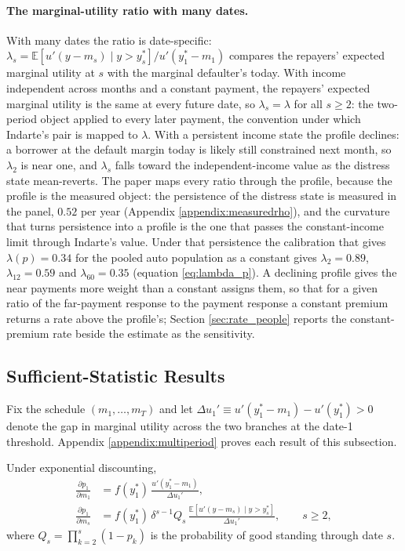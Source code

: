\paragraph{The marginal-utility ratio with many dates.} With many dates the ratio is date-specific: $\lambda_s = \mathbb{E}[u'(y - m_s) \mid y > y_s^*]/u'(y_1^* - m_1)$ compares the repayers' expected marginal utility at $s$ with the marginal defaulter's today. With income independent across months and a constant payment, the repayers' expected marginal utility is the same at every future date, so $\lambda_s = \lambda$ for all $s \ge 2$: the two-period object applied to every later payment, the convention under which Indarte's pair is mapped to $\lambda$. With a persistent income state the profile declines: a borrower at the default margin today is likely still constrained next month, so $\lambda_2$ is near one, and $\lambda_s$ falls toward the independent-income value as the distress state mean-reverts. The paper maps every ratio through the profile, because the profile is the measured object: the persistence of the distress state is measured in the panel, $0.52$ per year (Appendix \ref{appendix:measuredrho}), and the curvature that turns persistence into a profile is the one that passes the constant-income limit through Indarte's value. Under that persistence the calibration that gives $\lambda(p) = 0.34$ for the pooled auto population as a constant gives $\lambda_2 = 0.89$, $\lambda_{12} = 0.59$ and $\lambda_{60} = 0.35$ (equation \eqref{eq:lambda_p}). A declining profile gives the near payments more weight than a constant assigns them, so that for a given ratio of the far-payment response to the payment response a constant premium returns a rate above the profile's; Section \ref{sec:rate_people} reports the constant-premium rate beside the estimate as the sensitivity.

\subsection{Sufficient-Statistic Results}\label{sec:results}

Fix the schedule $(m_1,\dots,m_T)$ and let $\Delta u_1' \equiv u'(y_1^* - m_1) - u'(y_1^*) > 0$ denote the gap in marginal utility across the two branches at the date-1 threshold. Appendix \ref{appendix:multiperiod} proves each result of this subsection.

\begin{proposition}\label{prop:sensT}
Under exponential discounting,
\begin{align}
\frac{\partial p_1}{\partial m_1} &= f(y_1^*)\,\frac{u'(y_1^* - m_1)}{\Delta u_1'}, \label{eq:sens1T}\\
\frac{\partial p_1}{\partial m_s} &= f(y_1^*)\,\delta^{s-1} Q_s\, \frac{\mathbb{E}[u'(y - m_s) \mid y > y_s^*]}{\Delta u_1'}, \qquad s \ge 2, \label{eq:senssT}
\end{align}
where $Q_s = \prod_{k=2}^{s}(1-p_k)$ is the probability of good standing through date $s$.
\end{proposition}

